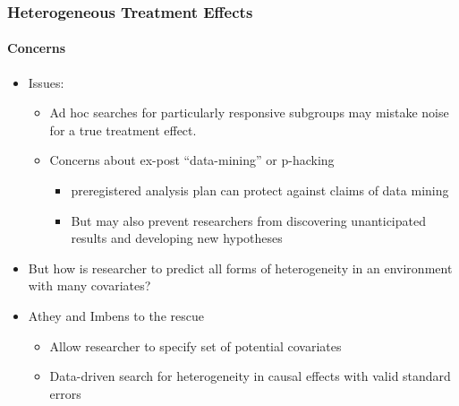 \documentclass[
  shownotes,
  xcolor={svgnames},
  hyperref={colorlinks,citecolor=DarkBlue,linkcolor=DarkRed,urlcolor=DarkBlue}
  , aspectratio=169]{beamer}
\begin{document}
\begin{frame}[fragile]
\frametitle{Heterogeneous Treatment Effects}

\framesubtitle{Concerns}

\begin{itemize}
  \item Issues:
  
  \begin{itemize}
  \item Ad hoc searches for particularly responsive subgroups may mistake noise for a true treatment effect. 
  
  \item Concerns about ex-post “data-mining” or  p-hacking
    \begin{itemize}
      \item preregistered analysis plan can protect against claims of data mining  
      \item But may also prevent researchers from discovering unanticipated results and developing new hypotheses
    \end{itemize}
  \end{itemize}
\medskip
\item But how is researcher to predict all forms of heterogeneity in an environment with many covariates?
\medskip
\item Athey and Imbens to the rescue
\begin{itemize}
  \item Allow researcher to specify set of potential covariates
  \item Data-driven search for heterogeneity in causal effects with valid standard errors
\end{itemize}


\end{itemize}


\end{frame}
\end{document}
